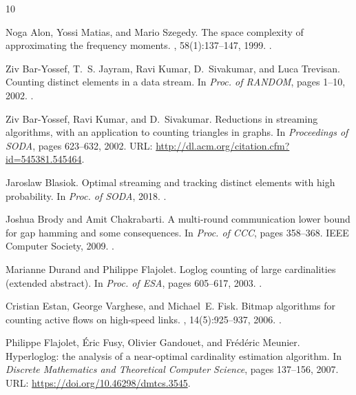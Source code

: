 \documentclass[a4paper,UKenglish,cleveref, autoref, thm-restate]{lipics-v2021}
\begin{document}
\begin{thebibliography}{10}

Noga Alon, Yossi Matias, and Mario Szegedy.
\newblock The space complexity of approximating the frequency moments.
, 58(1):137--147, 1999.
\newblock \href {https://doi.org/10.1006/jcss.1997.1545}
  {}.

Ziv Bar{-}Yossef, T.~S. Jayram, Ravi Kumar, D.~Sivakumar, and Luca Trevisan.
\newblock Counting distinct elements in a data stream.
\newblock In {\em Proc. of {RANDOM}}, pages 1--10, 2002.
\newblock \href {https://doi.org/10.1007/3-540-45726-7\_1}
  {}.

Ziv Bar{-}Yossef, Ravi Kumar, and D.~Sivakumar.
\newblock Reductions in streaming algorithms, with an application to counting
  triangles in graphs.
\newblock In {\em Proceedings of SODA}, pages 623--632, 2002.
\newblock URL: \url{http://dl.acm.org/citation.cfm?id=545381.545464}.

Jaroslaw Blasiok.
\newblock Optimal streaming and tracking distinct elements with high
  probability.
\newblock In {\em Proc. of SODA}, 2018.
\newblock \href {https://doi.org/10.1137/1.9781611975031.156}
  {}.

Joshua Brody and Amit Chakrabarti.
\newblock A multi-round communication lower bound for gap hamming and some
  consequences.
\newblock In {\em Proc. of CCC}, pages 358--368. {IEEE} Computer Society, 2009.
\newblock \href {https://doi.org/10.1109/CCC.2009.31}
  {}.

Marianne Durand and Philippe Flajolet.
\newblock Loglog counting of large cardinalities (extended abstract).
\newblock In {\em Proc. of ESA},
   pages 605--617, 2003.
\newblock \href {https://doi.org/10.1007/978-3-540-39658-1\_55}
  {}.

Cristian Estan, George Varghese, and Michael~E. Fisk.
\newblock Bitmap algorithms for counting active flows on high-speed links.
, 14(5):925--937, 2006.
\newblock \href {https://doi.org/10.1145/1217709} {}.

Philippe Flajolet, {\'E}ric Fusy, Olivier Gandouet, and Fr{\'e}d{\'e}ric
  Meunier.
\newblock Hyperloglog: the analysis of a near-optimal cardinality estimation
  algorithm.
\newblock In {\em Discrete Mathematics and Theoretical Computer Science}, pages
  137--156, 2007.
\newblock URL: \url{https://doi.org/10.46298/dmtcs.3545}.


\end{thebibliography}
\end{document}

